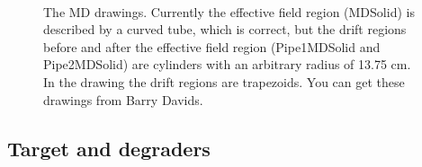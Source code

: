 \documentclass[letter,11pt]{article}
\begin{document}
\begin{figure}
\centering
 	\\
	\caption{The MD drawings. Currently the effective field region (MDSolid) is described by a curved tube, which is correct, but the drift regions before and after the effective field region (Pipe1MDSolid and Pipe2MDSolid) are cylinders with an arbitrary radius of 13.75 cm. In the drawing the drift regions are trapezoids. You can get these drawings from Barry Davids.}
	\label{fig:tetra}
\end{figure}

\newpage
\subsection{Target and degraders}
\end{document}
